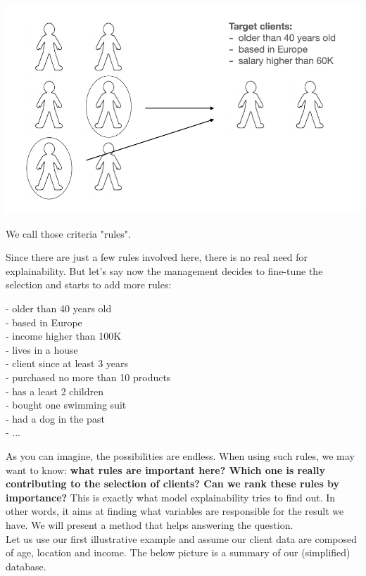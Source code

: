 \begin{center}
\includegraphics[scale=0.5]{./../img/clients-filter.png}
\end{center}

We call those criteria "rules".

Since there are just a few rules involved here, there is no real need for explainability. But let's say now the management decides to fine-tune the selection and starts to add more rules:

- older than 40 years old \\
- based in Europe \\
- income higher than 100K \\
- lives in a house \\
- client since at least 3 years \\
- purchased no more than 10 products \\
- has a least 2 children \\
- bought one swimming suit \\
- had a dog in the past \\
- ...

As you can imagine, the possibilities are endless. When using such rules, we may want to know: \textbf{what rules are important here? Which one is really contributing to the selection of clients? Can we rank these rules by importance?} This is exactly what model explainability tries to find out. In other words, it aims at finding what variables are responsible for the result we have. We will present a method that helps answering the question. \\

Let us use our first illustrative example and assume our client data are composed of age, location and income. The below picture is a summary of our (simplified) database. 

